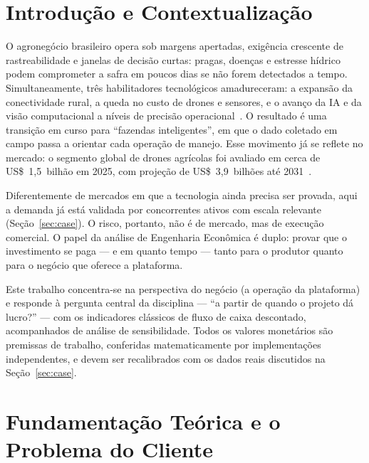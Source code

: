 \documentclass[conference]{IEEEtran}
\begin{document}
\section{Introdução e Contextualização}
O agronegócio brasileiro opera sob margens apertadas, exigência crescente de rastreabilidade e janelas de decisão curtas: pragas, doenças e estresse hídrico podem comprometer a safra em poucos dias se não forem detectados a tempo. Simultaneamente, três habilitadores tecnológicos amadureceram: a expansão da conectividade rural, a queda no custo de drones e sensores, e o avanço da IA e da visão computacional a níveis de precisão operacional~\cite{embrapa_ia,smartfarming,bndes_iot}. O resultado é uma transição em curso para ``fazendas inteligentes'', em que o dado coletado em campo passa a orientar cada operação de manejo. Esse movimento já se reflete no mercado: o segmento global de drones agrícolas foi avaliado em cerca de US\$~1,5~bilhão em 2025, com projeção de US\$~3,9~bilhões até 2031~\cite{mordor_drones}.

Diferentemente de mercados em que a tecnologia ainda precisa ser provada, aqui a demanda já está validada por concorrentes ativos com escala relevante (Seção~\ref{sec:case}). O risco, portanto, não é de mercado, mas de execução comercial. O papel da análise de Engenharia Econômica é duplo: provar que o investimento se paga --- e em quanto tempo --- tanto para o produtor quanto para o negócio que oferece a plataforma.

Este trabalho concentra-se na perspectiva do negócio (a operação da plataforma) e responde à pergunta central da disciplina --- ``a partir de quando o projeto dá lucro?'' --- com os indicadores clássicos de fluxo de caixa descontado, acompanhados de análise de sensibilidade. Todos os valores monetários são premissas de trabalho, conferidas matematicamente por implementações independentes, e devem ser recalibrados com os dados reais discutidos na Seção~\ref{sec:case}.

\section{Fundamentação Teórica e o Problema do Cliente}
\label{sec:rel}
\end{document}
